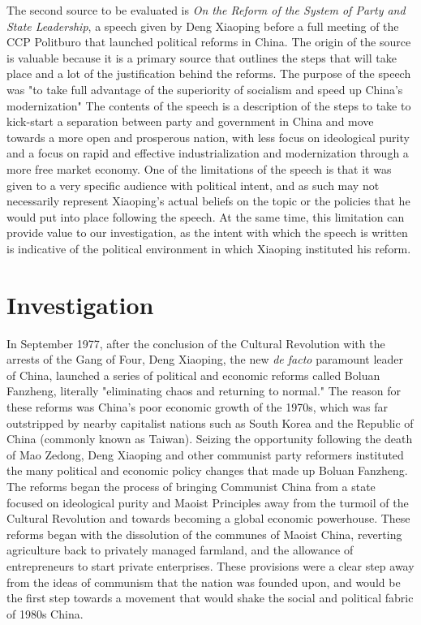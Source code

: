\documentclass{paper}
\begin{document}
The second source to be evaluated is \textit{On the Reform of the System of Party and State Leadership},\autocite{reforms} a speech given by Deng Xiaoping before a full meeting of the CCP Politburo that launched political reforms in China.
The origin of the source is valuable because it is a primary source that outlines the steps that will take place and a lot of the justification behind the reforms.
The purpose of the speech was "to take full advantage of the superiority of socialism and speed up China's modernization" The contents of the speech is a description of the steps to take to kick-start a separation between party and government in China and move towards a more open and prosperous nation, with less focus on ideological purity and a focus on rapid and effective industrialization and modernization through a more free market economy.
One of the limitations of the speech is that it was given to a very specific audience with political intent, and as such may not necessarily represent Xiaoping's actual beliefs on the topic or the policies that he would put into place following the speech.
At the same time, this limitation can provide value to our investigation, as the intent with which the speech is written is indicative of the political environment in which Xiaoping instituted his reform.
%
\newpage
%
\section{Investigation}
In September 1977, after the conclusion of the Cultural Revolution with the arrests of the Gang of Four, Deng Xiaoping, the new \emph{de facto} paramount leader of China, launched a series of political and economic reforms called Boluan Fanzheng, literally "eliminating chaos and returning to normal."
The reason for these reforms was China's poor economic growth of the 1970s, which was far outstripped by nearby capitalist nations such as South Korea and the Republic of China (commonly known as Taiwan).
Seizing the opportunity following the death of Mao Zedong, Deng Xiaoping and other communist party reformers instituted the many political and economic policy changes that made up Boluan Fanzheng.
The reforms began the process of bringing Communist China from a state focused on ideological purity and Maoist Principles away from the turmoil of the Cultural Revolution and towards becoming a global economic powerhouse.
These reforms began with the dissolution of the communes of Maoist China, reverting agriculture back to privately managed farmland, and the allowance of entrepreneurs to start private enterprises.\autocite{reforms}
These provisions were a clear step away from the ideas of communism that the nation was founded upon, and would be the first step towards a movement that would shake the social and political fabric of 1980s China.
\end{document}

